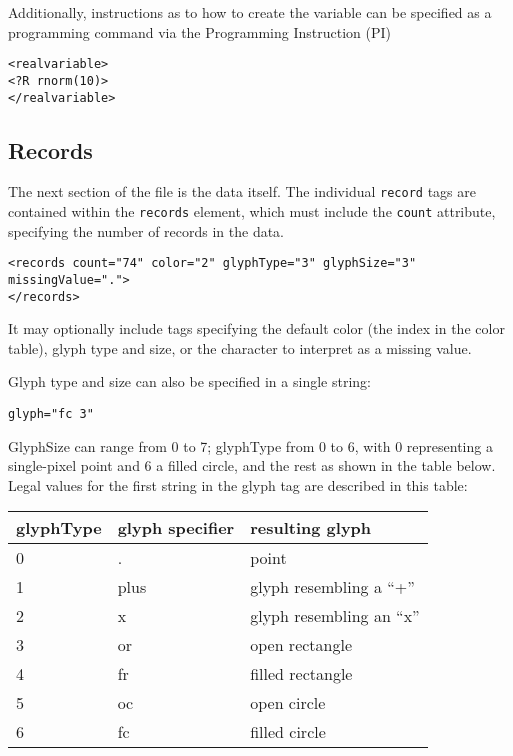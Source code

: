\documentclass{article}
\begin{document}


Additionally, instructions as to how to create the variable can be
specified as a programming command via the Programming Instruction (PI)
\begin{verbatim}
<realvariable>
<?R rnorm(10)>
</realvariable>
\end{verbatim}

\subsection{Records}

The next section of the file is the data itself.  The individual
\texttt{record} tags are contained within the \texttt{records}
element, which must include the \texttt{count} attribute, specifying
the number of records in the data.

\begin{verbatim}
<records count="74" color="2" glyphType="3" glyphSize="3" missingValue=".">
</records>
\end{verbatim}
%
It may optionally include tags specifying the default color (the
index in the color table), glyph type and size, or the character to
interpret as a missing value.

Glyph type and size can also be specified in a single string:
\begin{verbatim}
glyph="fc 3"
\end{verbatim}
GlyphSize can range from 0 to 7; glyphType from 0 to 6, with 0
representing a single-pixel point and 6 a filled circle, and
the rest as shown in the table below.  Legal values
for the first string in the glyph tag are described in this table:

\begin{tabular}{l|l|l}
glyphType & glyph specifier & resulting glyph \\
\hline
0 & .    & point \\
1 & plus & glyph resembling a ``+'' \\
2 & x    & glyph resembling an ``x'' \\
3 & or   & open rectangle \\
4 & fr   & filled rectangle \\
5 & oc   & open circle \\
6 & fc   & filled circle
\end{tabular}
\end{document}
